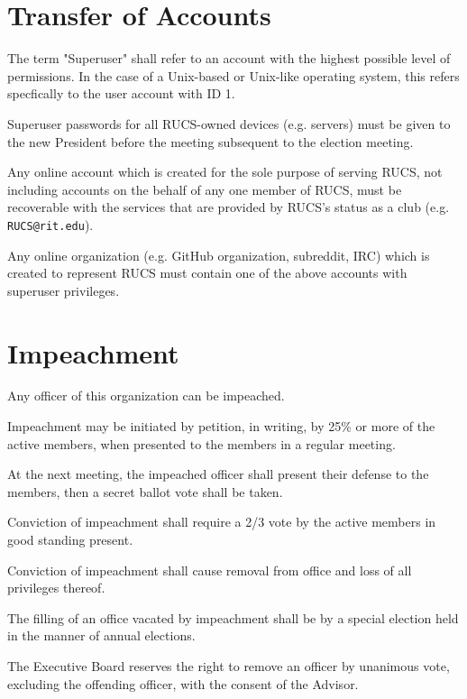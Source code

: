 \documentclass[a4paper]{article}
\begin{document}
\section{Transfer of Accounts}
\begin{subroutines}
\item The term "Superuser" shall refer to an account with the highest possible level of permissions. In the case of a Unix-based or Unix-like operating system, this refers specfically to the user account with ID 1.
\item Superuser passwords for all RUCS-owned devices (e.g. servers) must be given to the new President before the meeting subsequent to the election meeting.
\item Any online account which is created for the sole purpose of serving RUCS, not including accounts on the behalf of any one member of RUCS, must be recoverable with the services that are provided by RUCS's status as a club (e.g. \texttt{RUCS@rit.edu}).
\item Any online organization (e.g. GitHub organization, subreddit, IRC) which is created to represent RUCS must contain one of the above accounts with superuser privileges.
\end{subroutines}

\section{Impeachment}
\begin{subroutines}
\item Any officer of this organization can be impeached.
\item Impeachment may be initiated by petition, in writing, by 25\% or more of the active members, when presented to the members in a regular meeting.
\item At the next meeting, the impeached officer shall present their defense to the members, then a secret ballot vote shall be taken.
\item Conviction of impeachment shall require a 2/3 vote by the active members in good standing present.
\item Conviction of impeachment shall cause removal from office and loss of all privileges thereof.
\item The filling of an office vacated by impeachment shall be by a special election held in the manner of annual elections.
\item The Executive Board reserves the right to remove an officer by unanimous vote, excluding the offending officer, with the consent of the Advisor.
\end{subroutines}
\end{document}
